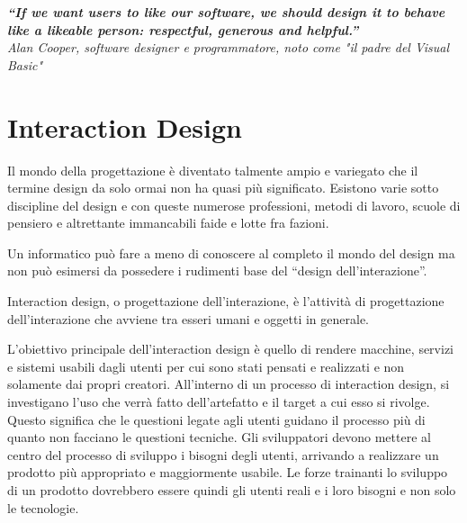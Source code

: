 
\begin{flushleft}
\textbf{ \textit{``If we want users to like our software, we should design it to behave like a likeable person: respectful, generous and helpful.''}}\\

\textit{Alan Cooper, software designer e programmatore, noto come "il padre del Visual Basic"}
    
\end{flushleft}


\section{Interaction Design}
Il mondo della progettazione è diventato talmente ampio e variegato che il termine design da solo ormai non ha quasi più significato. Esistono varie sotto discipline del design e con queste numerose professioni, metodi di lavoro, scuole di pensiero e altrettante immancabili faide e lotte fra fazioni.

Un informatico può fare a meno di conoscere al completo il mondo del design ma non può esimersi da possedere i rudimenti base del ``design dell'interazione''.

Interaction design, o progettazione dell'interazione, è l'attività di progettazione dell'interazione che avviene tra esseri umani e oggetti in generale. 


L'obiettivo principale dell'interaction design è quello di rendere macchine, servizi e sistemi usabili dagli utenti per cui sono stati pensati e realizzati e non solamente dai propri creatori. All'interno di un processo di interaction design, si investigano l'uso che verrà fatto dell'artefatto e il target a cui esso si rivolge. Questo significa che le questioni legate agli utenti guidano il processo più di quanto non facciano le questioni tecniche. Gli sviluppatori devono mettere al centro del processo di sviluppo i bisogni degli utenti, arrivando a realizzare un prodotto più appropriato e maggiormente usabile. Le forze trainanti lo sviluppo di un prodotto dovrebbero essere quindi gli utenti reali e i loro bisogni e non solo le tecnologie.


